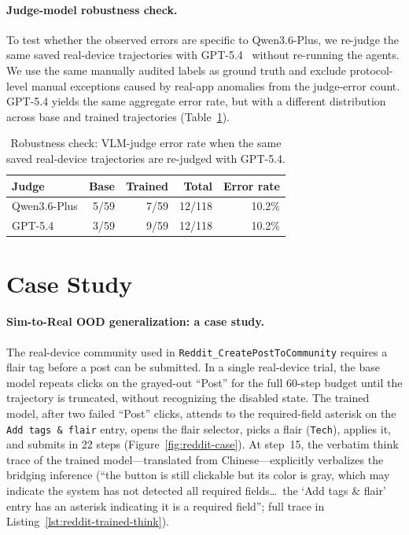 \documentclass{llmxive}
\begin{document}
\paragraph{Judge-model robustness check.}
To test whether the observed errors are specific to Qwen3.6-Plus, we re-judge the same saved real-device trajectories with GPT-5.4~\cite{GPT54} without re-running the agents. We use the same manually audited labels as ground truth and exclude protocol-level manual exceptions caused by real-app anomalies from the judge-error count. GPT-5.4 yields the same aggregate error rate, but with a different distribution across base and trained trajectories (Table~\ref{tab:gpt-rejudge}).

\begin{table}[!htbp]
  \centering\small
  \setlength{\tabcolsep}{4pt}
  \begin{tabular}{lrrrr}
    \toprule
    \textbf{Judge} & \textbf{Base} & \textbf{Trained} & \textbf{Total} & \textbf{Error rate} \\
    \midrule
    Qwen3.6-Plus & 5/59 & 7/59 & 12/118 & 10.2\% \\
    GPT-5.4      & 3/59 & 9/59 & 12/118 & 10.2\% \\
    \bottomrule
  \end{tabular}
  \caption{Robustness check: VLM-judge error rate when the same saved real-device trajectories are re-judged with GPT-5.4.}
  \label{tab:gpt-rejudge}
\end{table}


\section{Case Study}\label{app:case-study}

\paragraph{Sim-to-Real OOD generalization: a case study.} The real-device community used in \texttt{Reddit\_CreatePostToCommunity} requires a flair tag before a post can be submitted. In a single real-device trial, the base model repeats clicks on the grayed-out ``Post'' for the full 60-step budget until the trajectory is truncated, without recognizing the disabled state. The trained model, after two failed ``Post'' clicks, attends to the required-field asterisk on the \texttt{Add tags \& flair} entry, opens the flair selector, picks a flair (\texttt{Tech}), applies it, and submits in 22 steps (Figure~\ref{fig:reddit-case}). At step~15, the verbatim think trace of the trained model---translated from Chinese---explicitly verbalizes the bridging inference (``the button is still clickable but its color is gray, which may indicate the system has not detected all required fields\dots\ the `Add tags \& flair' entry has an asterisk indicating it is a required field''; full trace in Listing~\ref{lst:reddit-trained-think}).
\end{document}
